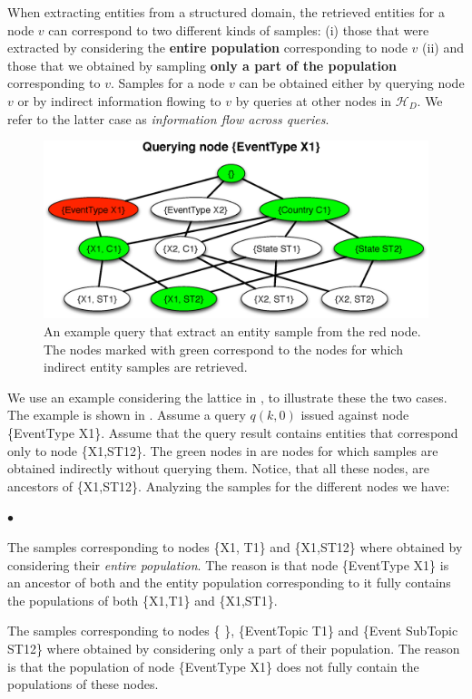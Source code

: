 \documentclass{vldb}
\newcommand{\squishlist}{
   \begin{list}{$\bullet$}
    {
      \setlength{\itemsep}{0pt}
      \setlength{\parsep}{3pt}
      \setlength{\topsep}{3pt}
      \setlength{\partopsep}{0pt}
      \setlength{\leftmargin}{1.5em}
      \setlength{\labelwidth}{1em}
      \setlength{\labelsep}{0.5em} } }
\newcommand{\squishend}{
    \end{list}  }
\newcommand{\hierarchy}{\mathcal{H}_D}
\begin{document}
When extracting entities from a structured domain, the retrieved entities for a node $v$ can correspond to two different kinds of samples: (i) those that were extracted by considering the {\bf entire population} corresponding to node $v$ (ii) and those that we obtained by sampling {\bf only a part of the population} corresponding to $v$. Samples for a node $v$ can be obtained either by querying node $v$ or by indirect information flowing to $v$ by queries at other nodes in $\hierarchy$. We refer to the latter case as {\em information flow across queries}. 
\begin{figure}[h]
	\begin{center}
	\includegraphics[clip,scale=0.32]{figs/exampleQuery.eps}
	\caption{An example query that extract an entity sample from the red node. The nodes marked with green correspond to the nodes for which indirect entity samples are retrieved.}
	\label{fig:query}
	\end{center}
	\vspace{-10pt}
\end{figure}

We use an example considering the lattice in , to illustrate these the two cases. The example is shown in . Assume a query $q(k,0)$ issued against node \{EventType X1\}. Assume that the query result contains entities that correspond only to node \{X1,ST12\}. The green nodes in  are nodes for which samples are obtained indirectly without querying them. Notice, that all these nodes, are ancestors of \{X1,ST12\}. Analyzing the samples for the different nodes we have:
\squishlist
\item The samples corresponding to nodes \{X1, T1\} and \{X1,ST12\} where obtained by considering their {\em entire population}. The reason is that node \{EventType X1\} is an ancestor of both and the entity population corresponding to it fully contains the populations of both \{X1,T1\} and \{X1,ST1\}. 
\item The samples corresponding to nodes \{ \}, \{EventTopic T1\} and \{Event SubTopic ST12\} where obtained by considering only a part of their population. The reason is that the population of node \{EventType X1\} does not fully contain the populations of these nodes. 
\squishend
\end{document}

